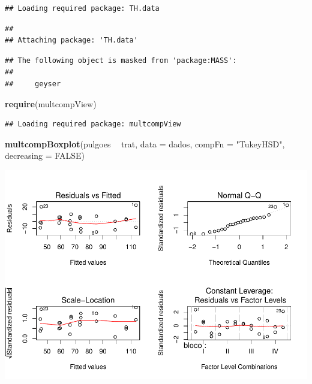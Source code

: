 \documentclass[
]{book}
\newenvironment{Shaded}{\begin{snugshade}}{\end{snugshade}}
\newcommand{\DataTypeTok}[1]{\textcolor[rgb]{0.13,0.29,0.53}{#1}}
\newcommand{\KeywordTok}[1]{\textcolor[rgb]{0.13,0.29,0.53}{\textbf{#1}}}
\newcommand{\NormalTok}[1]{#1}
\newcommand{\OperatorTok}[1]{\textcolor[rgb]{0.81,0.36,0.00}{\textbf{#1}}}
\newcommand{\OtherTok}[1]{\textcolor[rgb]{0.56,0.35,0.01}{#1}}
\newcommand{\StringTok}[1]{\textcolor[rgb]{0.31,0.60,0.02}{#1}}
\begin{document}
\begin{verbatim}
## Loading required package: TH.data
\end{verbatim}

\begin{verbatim}
## 
## Attaching package: 'TH.data'
\end{verbatim}

\begin{verbatim}
## The following object is masked from 'package:MASS':
## 
##     geyser
\end{verbatim}

\begin{Shaded}
\begin{Highlighting}[]
\KeywordTok{require}\NormalTok{(multcompView)}
\end{Highlighting}
\end{Shaded}

\begin{verbatim}
## Loading required package: multcompView
\end{verbatim}

\begin{Shaded}
\begin{Highlighting}[]
\KeywordTok{multcompBoxplot}\NormalTok{(pulgoes }\OperatorTok{~}\StringTok{ }\NormalTok{trat, }\DataTypeTok{data =}\NormalTok{ dados, }\DataTypeTok{compFn =} \StringTok{"TukeyHSD"}\NormalTok{, }\DataTypeTok{decreasing =} \OtherTok{FALSE}\NormalTok{)}
\end{Highlighting}
\end{Shaded}

\includegraphics{TudodoR_files/figure-latex/unnamed-chunk-314-1.pdf}
\end{document}
